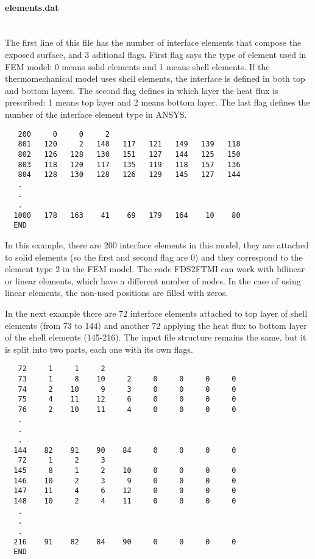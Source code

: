 \documentclass[11pt]{book}
\begin{document}
\paragraph{elements.dat}~\\
The first line of this file has the number of interface elements that compose the exposed surface, and 3 aditional flags. First flag says the type of element used in FEM model: 0 means solid elements and 1 means shell elements. If the thermomechanical model uses shell elements, the interface is defined in both top and bottom layers. The second flag defines in which layer the heat flux is prescribed: 1 means top layer and 2 means bottom layer. The last flag defines the number of the interface element type in A{\footnotesize NSYS}.

\begin{verbatim}
   200     0     0     2
   801   120     2   148   117   121   149   139   118
   802   126   128   130   151   127   144   125   150
   803   118   120   117   135   119   118   157   136
   804   128   130   128   126   129   145   127   144
   .
   .
   .
  1000   178   163    41    69   179   164    10    80
  END
\end{verbatim}
In this example, there are 200 interface elements in this model, they are attached to solid elements (so the first and second flag are 0) and they correspond to the element type 2 in the FEM model. The code FDS2FTMI can work with bilinear or linear elements, which have a different number of nodes. In the case of using linear elements, the non-used positions are filled with zeros. 

In the next example there are 72 interface elements attached to top layer of shell elements (from 73 to 144) and another 72 applying the heat flux to bottom layer of the shell elements (145-216). The input file structure remains the same, but it is split into two parts, each one with its own flags.

\begin{verbatim}
   72     1     1     2
   73     1     8    10     2     0     0     0     0
   74     2    10     9     3     0     0     0     0
   75     4    11    12     6     0     0     0     0
   76     2    10    11     4     0     0     0     0
   .
   .
   .
  144    82    91    90    84     0     0     0     0
   72     1     2     3
  145     8     1     2    10     0     0     0     0
  146    10     2     3     9     0     0     0     0
  147    11     4     6    12     0     0     0     0
  148    10     2     4    11     0     0     0     0   
   .
   .
   .
  216    91    82    84    90     0     0     0     0   
  END
\end{verbatim}
\end{document}
